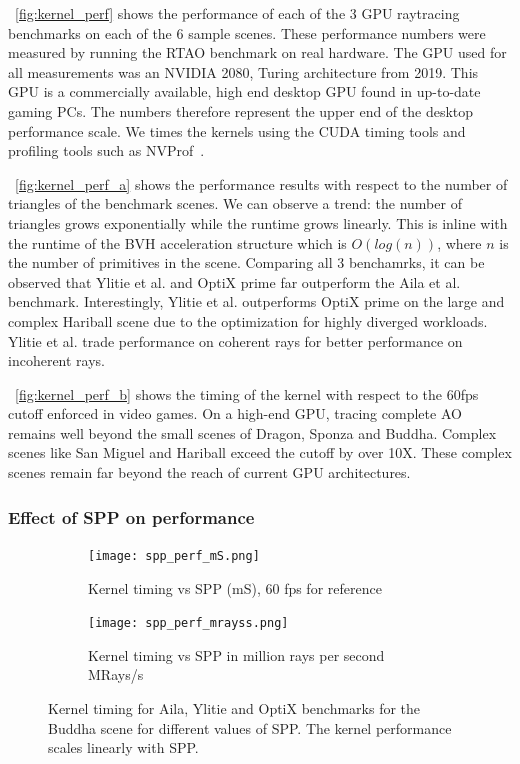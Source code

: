 ~\autoref{fig:kernel_perf} shows the performance of each of the 3 GPU raytracing benchmarks on each of the 6 sample scenes. These performance numbers were measured by running the RTAO benchmark on real hardware. The GPU used for all measurements was an NVIDIA 2080, Turing architecture from 2019. This GPU is a commercially available, high end desktop GPU found in up-to-date gaming PCs. The numbers therefore represent the upper end of the desktop performance scale. We times the kernels using the CUDA timing tools and profiling tools such as NVProf~\cite{NVIDIA-Turing}.

~\autoref{fig:kernel_perf_a} shows the performance results with respect to the number of triangles of the benchmark scenes. We can observe a trend: the number of triangles grows exponentially while the runtime grows linearly. This is inline with the runtime of the BVH acceleration structure which is $O(log(n))$, where $n$ is the number of primitives in the scene.
Comparing all 3 benchamrks, it can be observed that Ylitie et al. and OptiX prime far outperform the Aila et al. benchmark.
Interestingly, Ylitie et al. outperforms OptiX prime on the large and complex Hariball scene due to the optimization for highly diverged workloads. Ylitie et al. trade performance on coherent rays for better performance on incoherent rays.

~\autoref{fig:kernel_perf_b} shows the timing of the kernel with respect to the 60fps cutoff enforced in video games. On a high-end GPU, tracing complete AO remains well beyond the small scenes of Dragon, Sponza and Buddha. Complex scenes like San Miguel and Hariball exceed the cutoff by over 10X. These complex scenes remain far beyond the reach of current GPU architectures.  

\subsubsection{Effect of SPP on performance}

\begin{figure}[htb]
  \begin{subfigure}{0.49\textwidth}
  \texttt{[image: spp\_perf\_mS.png]}
  \caption{\label{fig:kernel_perf_a}Kernel timing vs SPP (mS), 60 fps for reference}
  \end{subfigure}
  \hspace*{\fill} %
  \begin{subfigure}{0.49\textwidth}
  \texttt{[image: spp\_perf\_mrayss.png]}
  \caption{\label{fig:kernel_perf_b}Kernel timing vs SPP in million rays per second MRays/s}
  \end{subfigure}

  \caption{\label{fig:kernel_perf}
           Kernel timing for Aila, Ylitie and OptiX benchmarks for the Buddha scene for different values of SPP. The kernel performance scales linearly with SPP. 
           }
\end{figure}

